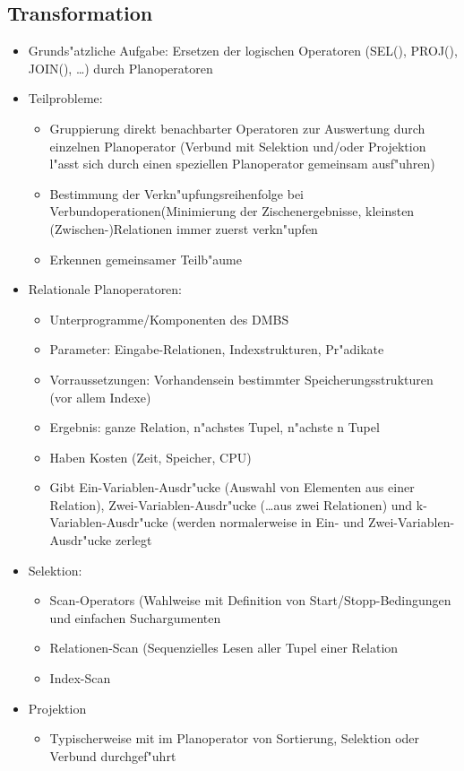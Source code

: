 \documentclass[a4paper, 12pt]{scrartcl}
\begin{document}
\subsection{Transformation}
\begin{itemize}
	\item
		Grunds"atzliche Aufgabe: Ersetzen der logischen Operatoren (SEL(), PROJ(), JOIN(), \dots) durch Planoperatoren
	\item
		Teilprobleme:
		\begin{itemize}
			\item
				Gruppierung direkt benachbarter Operatoren zur Auswertung durch einzelnen Planoperator (Verbund mit Selektion und/oder Projektion l"asst sich durch einen speziellen Planoperator gemeinsam ausf"uhren)
			\item
				Bestimmung der Verkn"upfungsreihenfolge bei Verbundoperationen(Minimierung der Zischenergebnisse, kleinsten (Zwischen-)Relationen immer zuerst verkn"upfen
			\item
				Erkennen gemeinsamer Teilb"aume
		\end{itemize}
	\item
		Relationale Planoperatoren:
		\begin{itemize}
			\item
				Unterprogramme/Komponenten des DMBS
			\item
				Parameter: Eingabe-Relationen, Indexstrukturen, Pr"adikate
			\item
				Vorraussetzungen: Vorhandensein bestimmter Speicherungsstrukturen (vor allem Indexe)
			\item
				Ergebnis: ganze Relation, n"achstes Tupel, n"achste n Tupel
			\item
				Haben Kosten (Zeit, Speicher, CPU)
			\item
				Gibt Ein-Variablen-Ausdr"ucke (Auswahl von Elementen aus einer Relation), Zwei-Variablen-Ausdr"ucke (\dots aus zwei Relationen) und k-Variablen-Ausdr"ucke (werden normalerweise in Ein- und Zwei-Variablen-Ausdr"ucke zerlegt
		\end{itemize}

	\item
		Selektion:
		\begin{itemize}
			\item
				Scan-Operators (Wahlweise mit Definition von Start/Stopp-Bedingungen und einfachen Suchargumenten
			\item
				Relationen-Scan (Sequenzielles Lesen aller Tupel einer Relation
			\item
				Index-Scan
		\end{itemize}
	\item
		Projektion
		\begin{itemize}
			\item
				Typischerweise mit im Planoperator von Sortierung, Selektion oder Verbund durchgef"uhrt
		\end{itemize}


\end{itemize}
\end{document}
